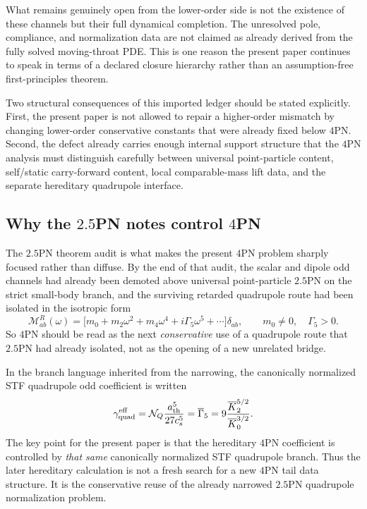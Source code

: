 \documentclass[11pt]{article}
\begin{document}
What remains genuinely open from the lower-order side is not the existence of
these channels but their full dynamical completion.  The unresolved pole,
compliance, and normalization data are not claimed as already derived from the
fully solved moving-throat PDE.  This is one reason the present paper continues
to speak in terms of a declared closure hierarchy rather than an assumption-free
first-principles theorem.

Two structural consequences of this imported ledger should be stated explicitly.
First, the present paper is not allowed to repair a higher-order mismatch by
changing lower-order conservative constants that were already fixed below $4$PN.
Second, the defect already carries enough internal support structure that the
$4$PN analysis must distinguish carefully between universal point-particle
content, self/static carry-forward content, local comparable-mass lift data, and
the separate hereditary quadrupole interface.

\subsection{Why the \texorpdfstring{$2.5$}{2.5}PN notes control \texorpdfstring{$4$}{4}PN}
\label{sec:dictionary-25pn-controls-4pn}

The $2.5$PN theorem audit is what makes the present $4$PN problem sharply
focused rather than diffuse.  By the end of that audit, the scalar and dipole
odd channels had already been demoted above universal point-particle $2.5$PN on
the strict small-body branch, and the surviving retarded quadrupole route had
been isolated in the isotropic form
\[
\mathcal M_{ab}^R(\omega)
=
\bigl[m_0+m_2\omega^2+m_4\omega^4+i\Gamma_5\omega^5+\cdots\bigr]\delta_{ab},
\qquad
m_0\neq 0,
\quad
\Gamma_5>0.
\]
So $4$PN should be read as the next \emph{conservative} use of a quadrupole
route that $2.5$PN had already isolated, not as the opening of a new unrelated
bridge.

In the branch language inherited from the narrowing, the canonically normalized
STF quadrupole odd coefficient is written
\[
\gamma_{\rm quad}^{\rm eff}
=
\mathcal N_Q\frac{a_{\rm th}^5}{27c_s^5}
=
\overline\Gamma_5
=
9\frac{\overline K_2^{5/2}}{\overline K_0^{3/2}}.
\]
The key point for the present paper is that the hereditary $4$PN coefficient is
controlled by \emph{that same} canonically normalized STF quadrupole branch.
Thus the later hereditary calculation is not a fresh search for a new $4$PN tail
data structure.  It is the conservative reuse of the already narrowed $2.5$PN
quadrupole normalization problem.
\end{document}
